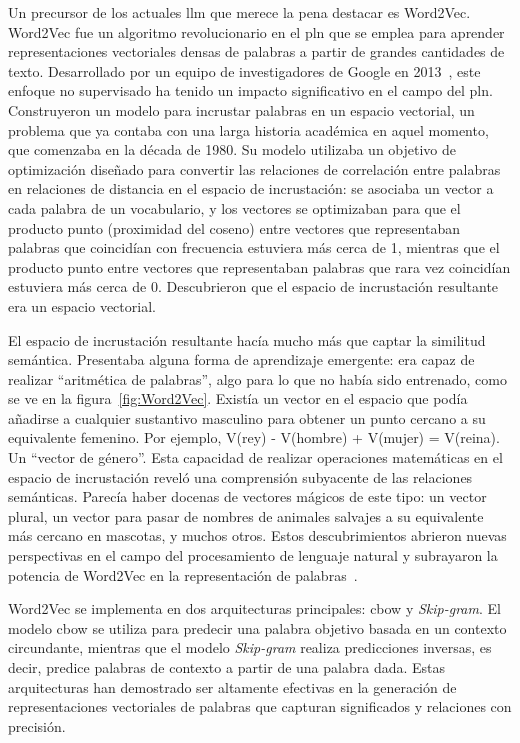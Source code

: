 Un precursor de los actuales \acrlong{llm} que merece la pena destacar es Word2Vec. Word2Vec fue un algoritmo revolucionario en el \acrfull{pln} que se emplea para aprender representaciones vectoriales densas de palabras a partir de grandes cantidades de texto. Desarrollado por un equipo de investigadores de Google en 2013~\cite{Mikolov2013Word2Vec}, este enfoque no supervisado ha tenido un impacto significativo en el campo del \acrshort{pln}. Construyeron un modelo para incrustar palabras en un espacio vectorial, un problema que ya contaba con una larga historia académica en aquel momento, que comenzaba en la década de 1980. Su modelo utilizaba un objetivo de optimización diseñado para convertir las relaciones de correlación entre palabras en relaciones de distancia en el espacio de incrustación: se asociaba un vector a cada palabra de un vocabulario, y los vectores se optimizaban para que el producto punto (proximidad del coseno) entre vectores que representaban palabras que coincidían con frecuencia estuviera más cerca de 1, mientras que el producto punto entre vectores que representaban palabras que rara vez coincidían estuviera más cerca de 0. Descubrieron que el espacio de incrustación resultante era un espacio vectorial. 

El espacio de incrustación resultante hacía mucho más que captar la similitud semántica. Presentaba alguna forma de aprendizaje emergente: era capaz de realizar ``aritmética de palabras'', algo para lo que no había sido entrenado, como se ve en la figura~\ref{fig:Word2Vec}. Existía un vector en el espacio que podía añadirse a cualquier sustantivo masculino para obtener un punto cercano a su equivalente femenino. Por ejemplo, V(rey) - V(hombre) + V(mujer) = V(reina). Un ``vector de género''. Esta capacidad de realizar operaciones matemáticas en el espacio de incrustación reveló una comprensión subyacente de las relaciones semánticas. Parecía haber docenas de vectores mágicos de este tipo: un vector plural, un vector para pasar de nombres de animales salvajes a su equivalente más cercano en mascotas, y muchos otros. Estos descubrimientos abrieron nuevas perspectivas en el campo del procesamiento de lenguaje natural y subrayaron la potencia de Word2Vec en la representación de palabras~\cite{Chollet}.


Word2Vec se implementa en dos arquitecturas principales: \acrfull{cbow} y \textit{Skip-gram}. El modelo \acrshort{cbow} se utiliza para predecir una palabra objetivo basada en un contexto circundante, mientras que el modelo \textit{Skip-gram} realiza predicciones inversas, es decir, predice palabras de contexto a partir de una palabra dada. Estas arquitecturas han demostrado ser altamente efectivas en la generación de representaciones vectoriales de palabras que capturan significados y relaciones con precisión.

